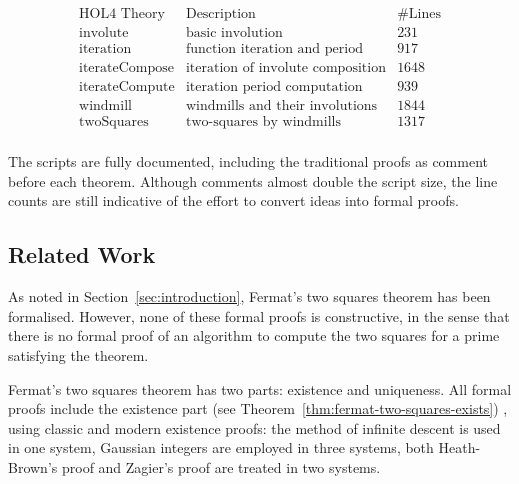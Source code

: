 \documentclass[sigplan,screen]{acmart}
\newcommand{\m}[1]{\todo[fancyline,color=blue!40,size=\scriptsize]{\textsf{JC: #1}}} %
\begin{document}
\begin{table}[h] %
\caption{Statistics of various theories in this work.}
\label{tbl:hol4-line-counts}  %
\[
\begin{array}{llr}
\text{HOL4 Theory}    & \text{Description}                        & \text{\#Lines}\\
\hline
\text{involute}       & \text{basic involution}                   & 231\\
\text{iteration}      & \text{function iteration and period}      & 917\\
\text{iterateCompose} & \text{iteration of involute composition}  & 1648\\
\text{iterateCompute} & \text{iteration period computation}       & 939\\
\text{windmill}       & \text{windmills and their involutions}    & 1844\\
\text{twoSquares}     & \text{two-squares by windmills}           & 1317\\
\end{array}
\]
\end{table}

\noindent
The scripts are fully documented, including the traditional proofs as comment before each theorem. Although comments almost double the script size, the line counts are still indicative of the effort to convert ideas into formal proofs.

\subsection{Related Work}
\label{sec:related-work}
As noted in Section~\ref{sec:introduction}, Fermat's two squares theorem has been formalised. However, none of these formal proofs is constructive, in the sense that there is no formal proof of an algorithm to compute the two squares for a prime satisfying the theorem.

Fermat's two squares theorem has two parts: existence and uniqueness.
All formal proofs include the existence part (see Theorem~\ref{thm:fermat-two-squares-exists}) , using classic and modern existence proofs: the method of infinite descent is used in one system, Gaussian integers are employed in three systems, both Heath-Brown's proof and Zagier's proof are treated in two systems.
\end{document}
